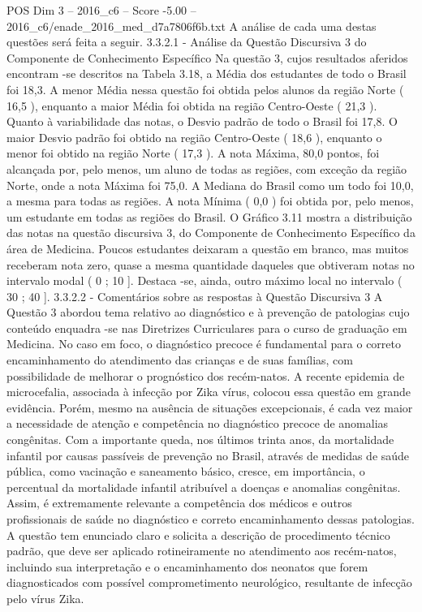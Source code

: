 \begin{textsample}{POS Dim 3 – 2016\_c6 – Score -5.00 – 2016\_c6/enade\_2016\_med\_d7a7806f6b.txt}
A análise de cada uma destas questões será feita a seguir. 3.3.2.1 - Análise da Questão Discursiva 3 do Componente de Conhecimento Específico Na questão 3, cujos resultados aferidos encontram -se descritos na Tabela 3.18, a Média dos estudantes de todo o Brasil foi 18,3.
A menor Média nessa questão foi obtida pelos alunos da região Norte ( 16,5 ), enquanto a maior Média foi obtida na região Centro-Oeste ( 21,3 ).
Quanto à variabilidade das notas, o Desvio padrão de todo o Brasil foi 17,8.
O maior Desvio padrão foi obtido na região Centro-Oeste ( 18,6 ), enquanto o menor foi obtido na região Norte ( 17,3 ).
A nota Máxima, 80,0 pontos, foi alcançada por, pelo menos, um aluno de todas as regiões, com exceção da região Norte, onde a nota Máxima foi 75,0.
A Mediana do Brasil como um todo foi 10,0, a mesma para todas as regiões.
A nota Mínima ( 0,0 ) foi obtida por, pelo menos, um estudante em todas as regiões do Brasil.
O Gráfico 3.11 mostra a distribuição das notas na questão discursiva 3, do Componente de Conhecimento Específico da área de Medicina.
Poucos estudantes deixaram a questão em branco, mas muitos receberam nota zero, quase a mesma quantidade daqueles que obtiveram notas no intervalo modal ( 0 ; 10 ].
Destaca -se, ainda, outro máximo local no intervalo ( 30 ; 40 ]. 3.3.2.2 - Comentários sobre as respostas à Questão Discursiva 3 A Questão 3 abordou tema relativo ao diagnóstico e à prevenção de patologias cujo conteúdo enquadra -se nas Diretrizes Curriculares para o curso de graduação em Medicina.
No caso em foco, o diagnóstico precoce é fundamental para o correto encaminhamento do atendimento das crianças e de suas famílias, com possibilidade de melhorar o prognóstico dos recém-natos.
A recente epidemia de microcefalia, associada à infecção por Zika vírus, colocou essa questão em grande evidência.
Porém, mesmo na ausência de situações excepcionais, é cada vez maior a necessidade de atenção e competência no diagnóstico precoce de anomalias congênitas.
Com a importante queda, nos últimos trinta anos, da mortalidade infantil por causas passíveis de prevenção no Brasil, através de medidas de saúde pública, como vacinação e saneamento básico, cresce, em importância, o percentual da mortalidade infantil atribuível a doenças e anomalias congênitas.
Assim, é extremamente relevante a competência dos médicos e outros profissionais de saúde no diagnóstico e correto encaminhamento dessas patologias.
A questão tem enunciado claro e solicita a descrição de procedimento técnico padrão, que deve ser aplicado rotineiramente no atendimento aos recém-natos, incluindo sua interpretação e o encaminhamento dos neonatos que forem diagnosticados com possível comprometimento neurológico, resultante de infecção pelo vírus Zika.

\end{textsample}
